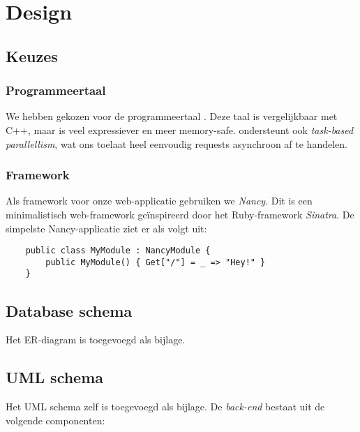 \documentclass[12pt,a4paper]{article}
\begin{document}
\section{Design}

\subsection{Keuzes}
\subsubsection{Programmeertaal}
We hebben gekozen voor de programmeertaal \CS{}. Deze taal is vergelijkbaar met
C++, maar is veel expressiever en meer memory-safe. \CS{} ondersteunt ook 
\textit{task-based parallellism}, wat ons toelaat heel eenvoudig requests 
asynchroon af te handelen.

\subsubsection{Framework}
Als framework voor onze web-applicatie gebruiken we \textit{Nancy}. Dit is een 
minimalistisch web-framework ge\"inspireerd door het Ruby-framework 
\textit{Sinatra}. De simpelste Nancy-applicatie ziet er als volgt uit:

\begin{lstlisting}
    public class MyModule : NancyModule {
        public MyModule() { Get["/"] = _ => "Hey!" }
    }
\end{lstlisting}

\subsection{Database schema}
Het ER-diagram is toegevoegd als bijlage.

\subsection{UML schema}

Het UML schema zelf is toegevoegd als bijlage. De \emph{back-end} bestaat uit de volgende componenten:
\end{document}
